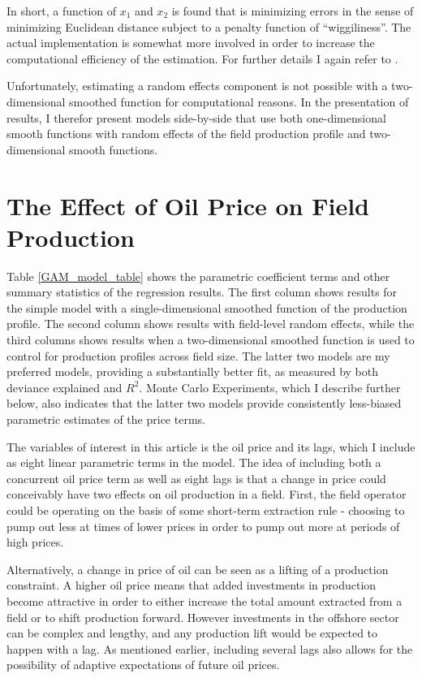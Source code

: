 \documentclass[11pt]{article}
\begin{document}
In short, a function of $x_1$ and $x_2$ is found that is minimizing errors in the sense of minimizing Euclidean distance subject to a penalty function of “wiggiliness”.  The actual implementation is somewhat more involved in order to increase the computational efficiency of the estimation.  For further details I again refer to \citet{wood_thin_2003}. 

Unfortunately, estimating a random effects component is not possible with a two-dimensional smoothed function for computational reasons.  In the presentation of results, I therefor present models side-by-side that use both one-dimensional smooth functions with random effects of the field production profile and two-dimensional smooth functions.

\section{The Effect of Oil Price on Field Production}

Table \ref{GAM_model_table} shows the parametric coefficient terms and other summary statistics of the regression results.  The first column shows results for the simple model with a single-dimensional smoothed function of the production profile.  The second column shows results with field-level random effects, while the third columns shows results when a two-dimensional smoothed function is used to control for production profiles across field size. The latter two models are my preferred models, providing a substantially better fit, as measured by both deviance explained and $R^2$. Monte Carlo Experiments, which I describe further below, also indicates that the latter two models provide consistently less-biased parametric estimates of the price terms.

The variables of interest in this article is the oil price and its lags, which I include as eight linear parametric terms in the model.  The idea of including both a concurrent oil price term as well as eight lags is that a change in price could conceivably have two effects on oil production in a field.  First, the field operator could be operating on the basis of some short-term extraction rule - choosing to pump out less at times of lower prices in order to pump out more at periods of high prices.  

Alternatively, a change in price of oil can be seen as a lifting of a production constraint.  A higher oil price means that added investments in production become attractive in order to either increase the total amount extracted from a field or to shift production forward.  However investments in the offshore sector can be complex and lengthy, and any production lift would be expected to happen with a lag.  As mentioned earlier, including several lags also allows for the possibility of adaptive expectations of future oil prices.  
\end{document}
